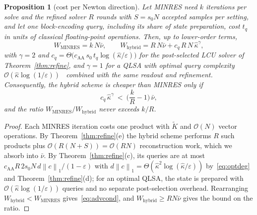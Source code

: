 \documentclass[11pt]{article}
\newtheorem{proposition}[theorem]{Proposition}
\theoremstyle{definition}
\newcommand{\norm}[1]{\left\lVert #1 \right\rVert}
\newcommand{\Kt}{\tilde K}
\newcommand{\kh}{\hat\kappa}
\newcommand{\eps}{\varepsilon}
\newcommand{\bigO}{\mathcal{O}}
\begin{document}
\begin{proposition}[cost per Newton direction]\label{prop:cost}
Let MINRES need $k$ iterations per solve and the refined solver $R$ rounds with $S=s_0N$ accepted samples per setting, and let one block-encoding query, including its share of state preparation, cost $t_q$ in units of classical floating-point operations. Then, up to lower-order terms,
\[
W_{\text{MINRES}}=k\,N\bar\nu,\qquad W_{\text{hybrid}}=R\,N\bar\nu+c_q\,R\,N\,\kh^{\gamma},
\]
with $\gamma=2$ and $c_q=\Theta\big(c_{\text{AA}}\,s_0\,t_q\log(\kh/\eps)\big)$ for the post-selected LCU solver of Theorem~\ref{thm:refine}, and $\gamma=1$ for a QLSA with optimal query complexity $\bigO(\kh\log(1/\eps))$~\cite{costa2022optimal,dalzell2024shortcut} combined with the same readout and refinement. Consequently, the hybrid scheme is cheaper than MINRES only if
\begin{equation}\label{eq:advcond}
c_q\,\kh^{\gamma}\ <\ \Big(\frac{k}{R}-1\Big)\,\bar\nu,
\end{equation}
and the ratio $W_{\text{MINRES}}/W_{\text{hybrid}}$ never exceeds $k/R$.
\end{proposition}
\begin{proof}
Each MINRES iteration costs one product with $\Kt$ and $\bigO(N)$ vector operations. By Theorem~\ref{thm:refine}(e) the hybrid scheme performs $R$ such products plus $\bigO(R(N+S))=\bigO(RN)$ reconstruction work, which we absorb into $\bar\nu$. By Theorem~\ref{thm:refine}(c), its queries are at most $c_{\text{AA}}R\,2s_0N\,d\norm{c}_1/(1-\eps)$ with $d\norm{c}_1=\Theta(\kh^2\log(\kh/\eps))$ by~\eqref{eq:optdeg} and Theorem~\ref{thm:refine}(d); for an optimal QLSA, the state is prepared with $\bigO(\kh\log(1/\eps))$ queries and no separate post-selection overhead. Rearranging $W_{\text{hybrid}}<W_{\text{MINRES}}$ gives~\eqref{eq:advcond}, and $W_{\text{hybrid}}\ge RN\bar\nu$ gives the bound on the ratio.
\end{proof}
\end{document}
